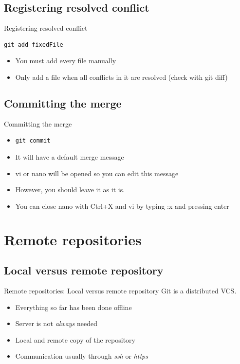 \documentclass[10pt,a4paper]{beamer}
\begin{document}
\subsection{Registering resolved conflict}
\begin{frame}[fragile]{Registering resolved conflict}
\begin{verbatim}
git add fixedFile
\end{verbatim}
\begin{itemize}
\item You must add every file manually
\item Only add a file when all conflicts in it are resolved (check with git diff)

\end{itemize}
\end{frame}

\subsection{Committing the merge}
\begin{frame}[fragile]{Committing the merge}
\begin{itemize}
\item \begin{verbatim}git commit\end{verbatim}
\item It will have a default merge message
\item vi or nano will be opened so you can edit this message
\item However, you should leave it as it is.
\item You can close nano with Ctrl+X and vi by typing :x and pressing enter
\end{itemize}
\end{frame}


\section{Remote repositories}

\subsection{Local versus remote repository}
\begin{frame}{Remote repositories: Local versus remote repository}
Git is a distributed VCS.

\begin{itemize}
\item Everything so far has been done offline
\item Server is not \textit{always} needed
\item Local and remote copy of the repository
\item Communication usually through \textit{ssh} or \textit{https}
\end{itemize}
\end{frame}
\end{document}
